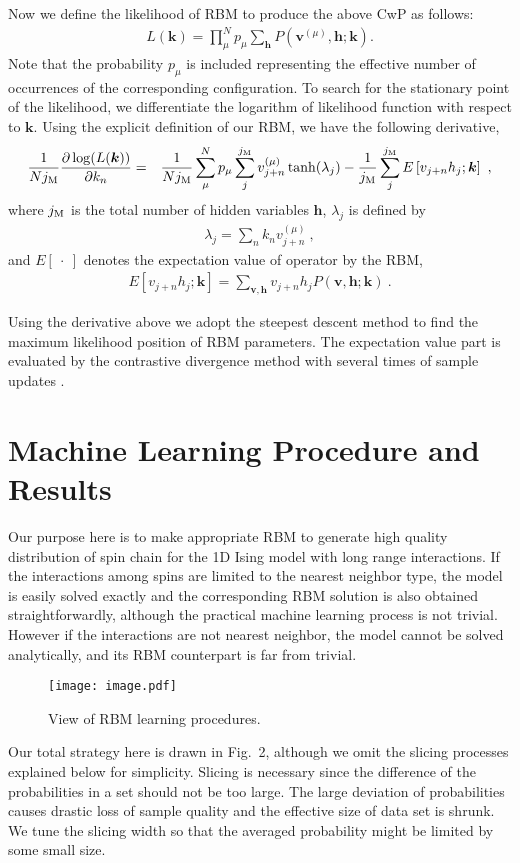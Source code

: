 \documentclass[a4paper,preprint,superscriptaddress,preprintnumbers,nofootinbib]{revtex4}
\newcommand{\Be}{\begin{eqnarray}}
\newcommand{\Ee}{\end{eqnarray}}
\begin{document}
Now we define the likelihood of RBM to produce the above 
CwP as follows:
\Be
L(\bm{k}) =\prod_{\mu}^{N} p_\mu\sum_{\bm{h}}P({\bm v}^{(\mu)} ,\bm{h};\bm{k}).
\Ee
Note that the probability $p_\mu$ is included representing the effective number 
of occurrences of the corresponding configuration.
To search for the stationary point of the likelihood, we differentiate the
logarithm of likelihood function with respect to $\bm{k}$.
Using the explicit definition of our RBM, we have the following
derivative,
\Be
\frac{1}{Nj_{\rm M}}\frac{\partial \log(L(\bm{k}))}{\partial k_{n}}
&=&\frac{1}{Nj_{\rm M}}\sum_{\mu}^{N} p_\mu\sum_j^{j_{\rm M}}
v_{j+n}^{(\mu)} \tanh (\lambda_j)
-\frac{1}{j_{\rm M}}\sum_j^{j_{\rm M}}E\left[ v_{j+n} h_j ;\bm{k} \right]\ ,
\Ee
where $j_{\rm M}$ is the total number of hidden variables $\bm{h}$,
$\lambda_j$ is defined by
\Be
\lambda_j= \sum_n k_n v_{j+n}^{(\mu)}\ ,
\Ee
and $E[\ \cdot\ ]$ denotes the expectation value of operator
by the RBM,
\Be
E\left[ v_{j+n} h_j ;\bm{k} \right]
= \sum_{\bm{v},\bm{h}}  v_{j+n} h_j P(\bm{v},\bm{h};\bm{k})\ .
\Ee

Using the derivative above we adopt the steepest descent method
to find the maximum likelihood position of RBM parameters.
The expectation value part is evaluated by the contrastive divergence
method with several times of sample updates \cite{Hinton02}.

\section{Machine Learning Procedure and Results}

Our purpose here is to make appropriate RBM to generate high quality
distribution of spin chain for the 1D Ising model with long
range interactions. If the interactions among spins are
limited to the nearest neighbor type, the model is easily
solved exactly and the corresponding RBM solution 
is also obtained straightforwardly, although the practical machine
learning process is not trivial. However if the interactions are not
nearest neighbor, the model cannot be solved analytically, and
its RBM counterpart is far from trivial.

\begin{figure}[htbp]
    \texttt{[image: image.pdf]}
    \caption{View of RBM learning procedures.}       
    \label{fig:image}
\end{figure}

Our total strategy here is drawn in Fig.~2, although we omit
the slicing processes explained below for simplicity. Slicing is necessary since
the difference of the probabilities in a set should not be too large.
The large deviation of probabilities causes 
drastic loss of sample quality and the effective size of data set is 
shrunk. We tune the slicing width 
so that the averaged probability might be limited by some small size.
\end{document}
